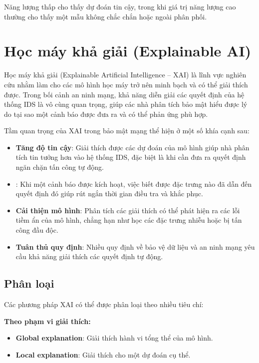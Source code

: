 Năng lượng thấp cho thấy dự đoán tin cậy, trong khi giá trị năng lượng cao thường cho thấy một mẫu không chắc chắn hoặc ngoài phân phối.

\section{Học máy khả giải (Explainable AI)}
\label{sec:xai}

Học máy khả giải (Explainable Artificial Intelligence -- XAI) là lĩnh vực nghiên cứu nhằm làm cho các mô hình học máy trở nên minh bạch và có thể giải thích được. Trong bối cảnh an ninh mạng, khả năng diễn giải các quyết định của hệ thống IDS là vô cùng quan trọng, giúp các nhà phân tích bảo mật hiểu được lý do tại sao một cảnh báo được đưa ra và có thể phản ứng phù hợp.

Tầm quan trọng của XAI trong bảo mật mạng thể hiện ở một số khía cạnh sau:
\begin{itemize}
    \item \textbf{Tăng độ tin cậy}: Giải thích được các dự đoán của mô hình giúp nhà phân tích tin tưởng hơn vào hệ thống IDS, đặc biệt là khi cần đưa ra quyết định ngăn chặn tấn công tự động.
    \item {}: Khi một cảnh báo được kích hoạt, việc biết được đặc trưng nào đã dẫn đến quyết định đó giúp rút ngắn thời gian điều tra và khắc phục.
    \item \textbf{Cải thiện mô hình}: Phân tích các giải thích có thể phát hiện ra các lỗi tiềm ẩn của mô hình, chẳng hạn như học các đặc trưng nhiễu hoặc bị tấn công đầu độc.
    \item \textbf{Tuân thủ quy định}: Nhiều quy định về bảo vệ dữ liệu và an ninh mạng yêu cầu khả năng giải thích các quyết định tự động.
\end{itemize}

\subsection{Phân loại}
Các phương pháp XAI có thể được phân loại theo nhiều tiêu chí:

\textbf{Theo phạm vi giải thích:}
\begin{itemize}
    \item \textbf{Global explanation}: Giải thích hành vi tổng thể của mô hình.
    \item \textbf{Local explanation}: Giải thích cho một dự đoán cụ thể.
\end{itemize}

